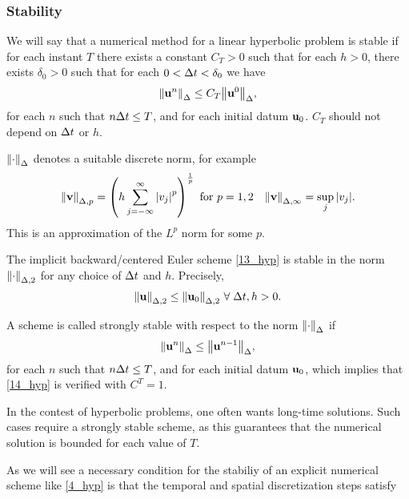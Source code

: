 \subsubsection*{Stability}
We will say that a numerical method for a linear hyperbolic problem is stable if for each instant \(T\) there exists a constant \(C_T > 0\) such that for each \(h>0\), there exists \(\delta_0 > 0\) such that for each \(0 < \Delta t < \delta_0\) we have 
\begin{equation}
    \norm{\textbf{u}^n}_\Delta \leq C_T \norm{\textbf{u}^0}_\Delta, 
    \label{14_hyp}
\end{equation}
for each \(n\) such that \(n\Delta t \leq T\), and for each initial datum \(\textbf{u}_0\). \(C_T\) should not depend on \(\Delta t\) or \(h\).
\begin{notation}
    \(\norm{\cdot}_\Delta\) denotes a suitable discrete norm, for example 
    \begin{equation}
        \norm{\textbf{v}}_{\Delta,p} = \left( h\sum_{j=-\infty}^{\infty} \abs{v_j}^p\right)^{\frac{1}{p}} \text{ for } p = 1,2 \quad \norm{\textbf{v}}_{\Delta,\infty} = \sup_j \abs{v_j}.
        \label{15_hyp}
    \end{equation}
    This is an approximation of the \(L^p\) norm for some \(p\).
\end{notation}
\begin{theorem}
    The implicit backward/centered Euler scheme \eqref{13_hyp} is stable in the norm \(\norm{\cdot}_{\Delta,2}\) for any choice of \(\Delta t\) and \(h\). Precisely,
    \[
        \norm{\textbf{u}}_{\Delta,2} \leq \norm{\textbf{u}_0}_{\Delta,2} \ \forall \; \Delta t, h >0.    
    \]
\end{theorem}
A scheme is called strongly stable with respect to the norm \(\norm{\cdot}_\Delta\) if 
\begin{equation}
    \norm{\textbf{u}^n}_\Delta \leq \norm{\textbf{u}^{n-1}}_\Delta, 
    \label{18_hyp} 
\end{equation}
for each \(n\) such that \(n\Delta t \leq T\), and for each initial datum \(\textbf{u}_0\), which implies that \eqref{14_hyp} is verified with \(C^T=1\).
\begin{remark}
    In the contest of hyperbolic problems, one often wants long-time solutions. Such cases require a strongly stable scheme, as this guarantees that the numerical solution is bounded for each value of \(T\).
\end{remark} 
As we will see a necessary condition for the stabiliy of an explicit numerical scheme like \eqref{4_hyp} is that the temporal and spatial discretization steps satisfy

